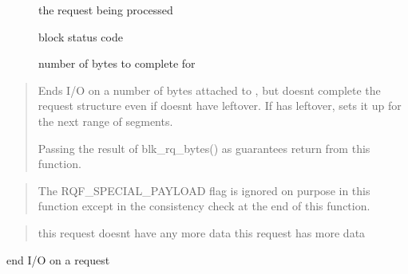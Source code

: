 \documentclass[a4paper,11pt,english]{sphinxmanual}
\begin{document}
\begin{description}
\item[{}] \leavevmode
the request being processed

\item[{}] \leavevmode
block status code

\item[{}] \leavevmode
number of bytes to complete for 

\end{description}

\begin{quote}

Ends I/O on a number of bytes attached to , but doesn\textquotesingle{}t complete
the request structure even if  doesn\textquotesingle{}t have leftover.
If  has leftover, sets it up for the next range of segments.

Passing the result of blk\_rq\_bytes() as  guarantees
 return from this function.
\end{quote}

\begin{quote}

The RQF\_SPECIAL\_PAYLOAD flag is ignored on purpose in this function
except in the consistency check at the end of this function.
\end{quote}

\begin{quote}

 \sphinxhyphen{} this request doesn\textquotesingle{}t have any more data
  \sphinxhyphen{} this request has more data
\end{quote}

\begin{fulllineitems}
\label{\detokenize{blk-mq:c.blk_mq_complete_request}}
end I/O on a request

\end{fulllineitems}
\end{document}
